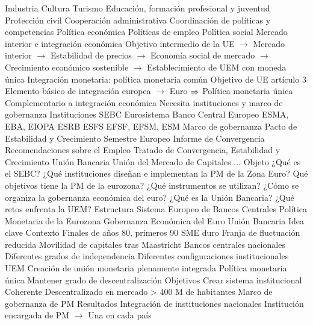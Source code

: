 \documentclass{nuevotema}
\begin{document}
\begin{esquemal}
				\4[] Industria
				\4[] Cultura
				\4[] Turismo
				\4[] Educación, formación profesional y juventud
				\4[] Protección civil
				\4[] Cooperación administrativa
				\4 Coordinación de políticas y competencias
				\4[] Política económica
				\4[] Políticas de empleo
				\4[] Política social
			\3 Mercado interior e integración económica
				\4 Objetivo intermedio de la UE
				\4[] $\to$ Mercado interior
				\4[] $\to$ Estabilidad de precios
				\4[] $\to$ Economía social de mercado
				\4[] $\to$ Crecimiento económico sostenible
				\4[] $\to$ Establecimiento de UEM con moneda única
			\3 Integración monetaria: política monetaria común
				\4 Objetivo de UE artículo 3
				\4 Elemento básico de integración europea
				\4[] $\to$ Euro
				\4[] $\then$ Política monetaria única
				\4 Complementario a integración económica
				\4[$\then$] Necesita instituciones y marco de gobernanza
			\3 Instituciones
				\4 SEBC
				\4 Eurosistema
				\4 Banco Central Europeo
				\4 ESMA, EBA, EIOPA
				\4 ESRB
				\4 ESFS
				\4 EFSF, EFSM, ESM
			\3 Marco de gobernanza
				\4 Pacto de Estabilidad y Crecimiento
				\4 Semestre Europeo
				\4 Informe de Convergencia
				\4 Recomendaciones sobre el Empleo
				\4 Tratado de Convergencia, Estabilidad y Crecimiento
				\4 Unión Bancaria
				\4 Unión del Mercado de Capitales
				\4 ...
		\2 Objeto
			\3 ¿Qué es el SEBC?
			\3 ¿Qué instituciones diseñan e implementan la PM de la Zona Euro?
			\3 Qué objetivos tiene la PM de la eurozona?
			\3 ¿Qué instrumentos se utilizan?
			\3 ¿Cómo se organiza la gobernanza económica del euro?
			\3 ¿Qué es la Unión Bancaria?
			\3 ¿Qué retos enfrenta la UEM?
		\2 Estructura
			\3 Sistema Europeo de Bancos Centrales
			\3 Política Monetaria de la Eurozona
			\3 Gobernanza Económica del Euro
			\3 Unión Bancaria
	\1 
		\2 Idea clave
			\3 Contexto
				\4 Finales de años 80, primeros 90
				\4 SME duro
				\4[] Franja de fluctuación reducida
				\4[] Movilidad de capitales tras Maastricht
				\4 Bancos centrales nacionales
				\4[] Diferentes grados de independencia
				\4[] Diferentes configuraciones institucionales
				\4 UEM
				\4[] Creación de unión monetaria plenamente integrada
				\4[] Política monetaria única
				\4[] Mantener grado de descentralización
			\3 Objetivos
				\4 Crear sistema institucional
				\4[] Coherente
				\4[] Descentralizado en mercado > 400 M de habitantes
				\4 Marco de gobernanza de PM
			\3 Resultados
				\4 Integración de instituciones nacionales
				\4[] Institución encargada de PM
				\4[] $\to$ Una en cada país

\end{esquemal}
\end{document}
